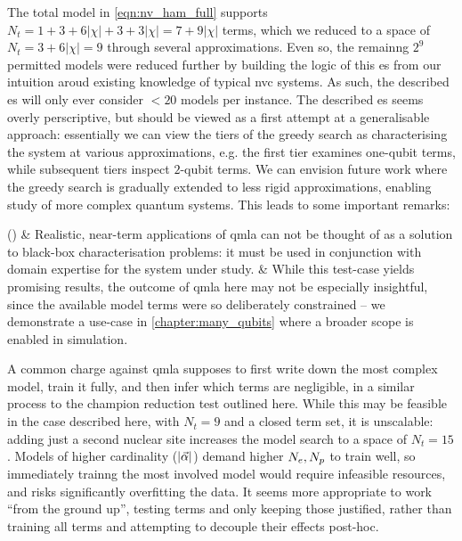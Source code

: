 The total model in \cref{eqn:nv_ham_full} supports $N_t = 1 + 3 + 6 | \chi | + 3 + 3 |\chi| = 7 + 9|\chi| $ terms, 
    which we reduced to a space of $N_t=3 + 6 |\chi| = 9$ through several approximations\footnotemark.
Even so, the remainng $2^9$ permitted models were reduced further by building the logic of this \gls{es} 
    from our intuition aroud existing knowledge of typical \gls{nvc} systems.
As such, the described \gls{es} will only ever consider $<20$ models per instance. 
The described \gls{es} seems overly perscriptive, 
    but should be viewed as a first attempt at a generalisable approach: 
    essentially we can view the tiers of the greedy search as characterising the system 
    at various approximations, 
    e.g. the first tier examines one-qubit terms, while subsequent tiers inspect $2$-qubit terms. 
We can envision future work where the greedy search is gradually extended to less rigid approximations, 
    enabling study of more complex quantum systems.     
This leads to some important remarks:

\begin{easylist}[enumerate]
    \ListProperties()
    & Realistic, near-term applications of \gls{qmla} can not be thought of as a solution to black-box characterisation problems: 
        it must be used in conjunction with domain expertise for the system under study.
    & While this test-case yields promising results, the outcome of \gls{qmla} here may not be especially insightful, 
        since the available model terms were so deliberately constrained -- we demonstrate a use-case in \cref{chapter:many_qubits} 
        where a broader scope is enabled in simulation.    
\end{easylist}   
\par 

A common charge against \gls{qmla} supposes to first write down the most complex model, 
    train it fully, and then infer which terms are negligible, in a similar process to the champion reduction test outlined here. 
While this may be feasible in the case described here, with $N_t=9$ and a closed term set, 
    it is unscalable: adding just a second nuclear site increases the model search to a space of $N_t=15$.
Models of higher cardinality ($|\vec{\alpha}|$) demand higher $N_e, N_p$ to train well, so immediately trainng the most involved model would 
    require infeasible resources\footnotemark, and risks significantly overfitting the data. 
It seems more appropriate to work ``from the ground up'', testing terms and only keeping those justified, 
    rather than training all terms and attempting to decouple their effects post-hoc. 


